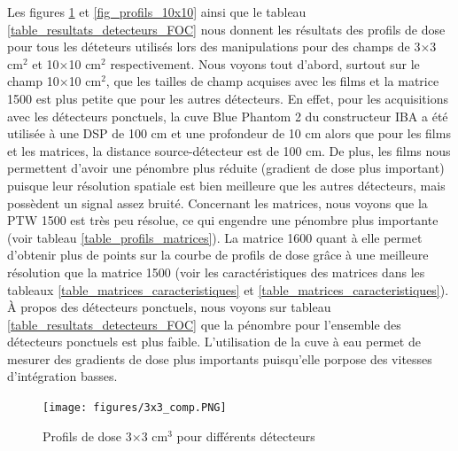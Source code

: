 \documentclass{book}
\begin{document}
Les figures \ref*{fig_profils_3x3}  et \ref*{fig_profils_10x10} ainsi que le tableau \ref*{table_resultats_detecteurs_FOC} nous donnent les résultats des profils de dose pour tous les déteteurs utilisés lors des manipulations pour des champs de 3$\times$3 cm$^2$  et 10$\times$10 cm$^2$ respectivement. Nous voyons tout d'abord, surtout sur le champ 10$\times$10 cm$^2$, que les tailles de champ acquises avec les films et la matrice 1500 est plus petite que pour les autres détecteurs. En effet, pour les acquisitions avec les détecteurs ponctuels, la cuve Blue Phantom 2 du constructeur IBA a été utilisée à une DSP de 100 cm et une profondeur de 10 cm alors que pour les films et les matrices, la distance source-détecteur est de 100 cm. De plus, les films nous permettent d'avoir une pénombre plus réduite (gradient de dose plus important) puisque leur résolution spatiale est bien meilleure que les autres détecteurs, mais possèdent un signal assez bruité. Concernant les matrices, nous voyons que la PTW 1500 est très peu résolue, ce qui engendre une pénombre plus importante (voir tableau \ref*{table_profils_matrices}). La matrice 1600 quant à elle permet d'obtenir plus de points sur la courbe de profils de dose grâce à une meilleure résolution que la matrice 1500 (voir les caractéristiques des matrices dans les tableaux \ref*{table_matrices_caracteristiques} et \ref*{table_matrices_caracteristiques}). À propos des détecteurs ponctuels, nous voyons sur tableau \ref*{table_resultats_detecteurs_FOC} que la pénombre pour l'ensemble des détecteurs ponctuels est plus faible. L'utilisation de la cuve à eau permet de mesurer des gradients de dose plus importants puisqu'elle porpose des vitesses d'intégration basses.

\begin{figure}[h]
  \centering
  \texttt{[image: figures/3x3\_comp.PNG]}
  \caption{Profils de dose 3$\times$3 cm$^3$ pour différents détecteurs}
  \label{fig_profils_3x3}
\end{figure}
\end{document}
